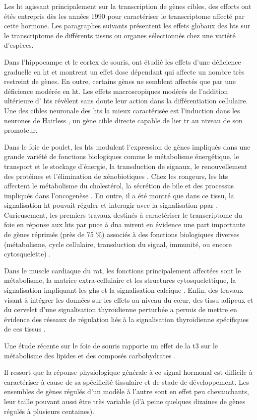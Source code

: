 \documentclass[../main.tex]{subfiles}
\begin{document}
Les \gls{ht} agissant principalement sur la transcription de gènes cibles, des efforts ont étés entrepris dès les années 1990 pour caractériser le transcriptome affecté par cette hormone.
Les paragraphes suivants présentent les effets globaux des \glspl{ht} sur le transcriptome de différents tissus ou organes sélectionnés chez une variété d'espèces.
\par
Dans l'hippocampe et le cortex de souris, \citet{Chatonnet2011} ont étudié les effets d'une déficience graduelle en \gls{ht} et montrent un effet dose dépendant qui affecte un nombre très restreint de gènes.
En outre, certains gènes ne semblent affectés que par une déficience modérée en \gls{ht}.
Les effets macroscopiques modérés de l'addition ultérieure d' \glspl{ht} révèlent sans doute leur action dans la différentiation cellulaire.
Une des cibles neuronale des \glspl{ht} la mieux caractérisée est l'induction dans les neurones de Hairless \citep{Thompson1996}, un gène cible directe capable de lier \gls{tr} au niveau de son promoteur.
\par
Dans le foie de poulet, les \glspl{ht} modulent l'expression de gènes impliqués dans une grande variété de fonctions biologiques comme le métabolisme énergétique, le transport et le stockage d'énergie, la transduction de signaux, le renouvellement des protéines et l'élimination de xénobiotiques \citep{Wang2007}.
Chez les rongeurs, les \glspl{ht} affectent le métabolisme du cholestérol, la sécrétion de bile et des processus impliqués dans l'oncogenèse \citep{Ventura-Holman2007}.
En outre, il a été montré que dans ce tissu, la signalisation \gls{ht} pouvait réguler et interagir avec la signalisation \gls{ppar} \citep{Weitzel2003}.
Curieusement, les premiers travaux destinés à caractériser le transcriptome du foie en réponse aux  \glspl{ht} par puce à \gls{dna} mirent en évidence une part importante de gènes réprimés (près de 75 \%) associés à des fonctions biologiques diverses (métabolisme, cycle cellulaire, transduction du signal, immunité, ou encore cytosquelette) \citep{Feng2000}.
\par
Dans le muscle cardiaque du rat, les fonctions principalement affectées sont le métabolisme, la matrice extra-cellulaire et les structures cytosquelettique, la signalisation impliquant les \glspl{gh} et la signalisation calcique \citep{De2004}.
Enfin, des travaux visant à intégrer les données sur les effets au niveau du cœur, des tissu adipeux et du cervelet d'une signalisation thyroïdienne perturbée a permis de mettre en évidence des réseaux de régulation liés à la signalisation thyroïdienne spécifiques de ces tissus \citep{Miller2004}.
\par
Une étude récente sur le foie de souris rapporte un effet de la \gls{t3} sur le métabolisme des lipides et des composés carbohydrates \citep{Ramadoss2014}.
\par
Il ressort que la réponse physiologique générale à ce signal hormonal est difficile à caractériser à cause de sa spécificité tissulaire et de stade de développement.
Les ensembles de gènes régulés d'un modèle à l'autre sont en effet peu chevauchants, leur taille pouvant aussi être très variable (d'à peine quelques dizaines de gènes régulés à plusieurs centaines).

\end{document}
